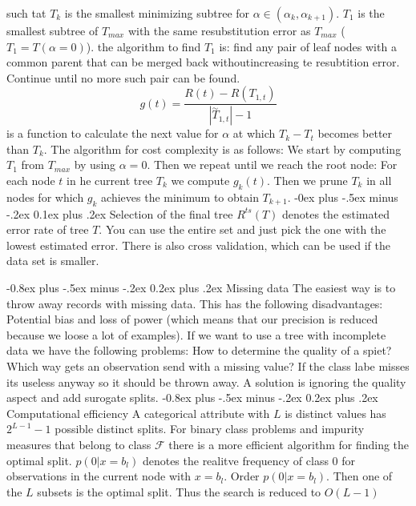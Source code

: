 \documentclass[8pt,landscape]{extarticle}
\makeatletter
\renewcommand{\subsection}{\@startsection{subsection}{2}{0mm}%
                                {-0.8ex plus -.5ex minus -.2ex}%
                                {0.2ex plus .2ex}%
                                {\normalfont\normalsize\bfseries}}
\renewcommand{\subsubsection}{\@startsection{subsubsection}{3}{0mm}%
                                {-0ex plus -.5ex minus -.2ex}%
                                {0.1ex plus .2ex}%
                                {\normalfont\small\bfseries}}
\makeatother
\begin{document}
\begin{multicols}{3}
such tat $T_k$ is the smallest minimizing subtree for
$\alpha \in (\alpha_k, \alpha_{k+1})$. $T_1$ is the smallest subtree of $T_{max}$
with the same resubstitution error as $T_{max}$ ($T_1=T(\alpha=0)$).
the algorithm to find $T_1$ is: find any pair of leaf nodes with a common parent
that can be merged back withoutincreasing te resubtition error. Continue until
no more such pair can be found.
\[g(t)=\frac{R(t)-R(T_{1,t})}{|\overset{\sim}{T}_{1,t}|-1}\]
is a function to calculate the next value for $\alpha$ at which $T_k - T_t$
becomes better than $T_k$.
The algorithm for cost complexity is as follows: We start by computing $T_1$ from $T_{max}$
by using $\alpha = 0$. Then we repeat until we reach the root node:
For each node $t$ in he current tree $T_k$ we compute $g_k(t)$. Then we prune
$T_k$ in all nodes for which $g_k$ achieves the minimum to obtain $T_{k+1}$.
\subsubsection{Selection of the final tree}
$R^{ts}(T)$ denotes the estimated error rate of tree $T$. You can use
the entire set and just pick the one with the lowest estimated error.
There is also cross validation, which can be used if the data set is smaller.

\subsection{Missing data}
The easiest way is  to throw away records with missing data.
This has the following disadvantages: Potential bias and loss of power (which
means that our precision is reduced because we loose a lot of examples).
If we want to use a tree with incomplete data we have the following problems:
How to determine the quality of a spiet? Which way gets an observation send
with a missing value?
If the class labe misses its useless anyway so it should be thrown away.
A solution is ignoring the quality aspect and add surogate splits.
\subsection{Computational efficiency}
A categorical attribute with $L$ is distinct values has $2^{L-1}-1$ possible
distinct splits.
For binary class problems and impurity measures that belong to class $\mathcal{F}$
there is a more efficient algorithm for finding the optimal split.
$p(0|x=b_l)$  denotes the realitve frequency of class 0 for observations in the
current node with $x=b_l$. Order $p(0|x=b_l)$. Then one of the $L$ subsets
is the optimal split. Thus the search is reduced to $O(L-1)$

\end{multicols}
\end{document}
